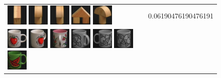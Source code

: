 \begin{figure}[!bp]
\begin{tabular}{m{11cm} | m{3cm} |}
\includegraphics[width=1cm]{coil/beeld-47.eps}
\includegraphics[width=1cm]{coil/beeld-5.eps}
\includegraphics[width=1cm]{coil/beeld-2.eps}
\includegraphics[width=1cm]{coil/beeld-43.eps}
\includegraphics[width=1cm]{coil/beeld-4.eps}
& {\scriptsize 0.06190476190476191}
\\
\includegraphics[width=1cm]{coil/beeld-36.eps}
\includegraphics[width=1cm]{coil/beeld-39.eps}
\includegraphics[width=1cm]{coil/beeld-11.eps}
\includegraphics[width=1cm]{coil/beeld-52.eps}
\includegraphics[width=1cm]{coil/beeld-49.eps}
\includegraphics[width=1cm]{coil/beeld-50.eps}
\includegraphics[width=1cm]{coil/beeld-30.eps}

\end{tabular}
\end{figure}
